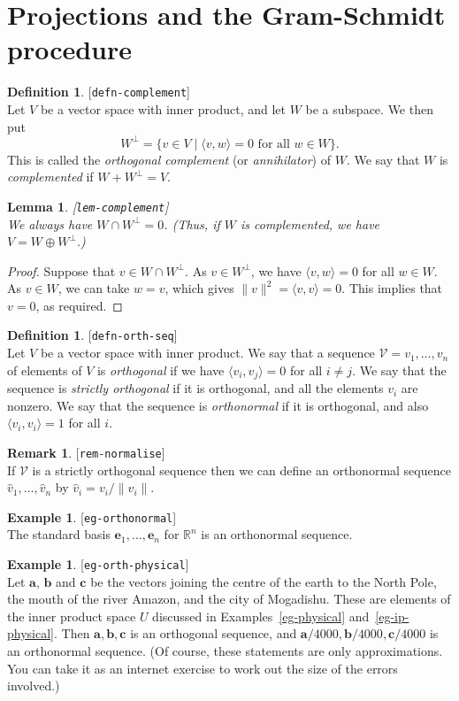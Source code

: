 \documentclass{amsart}
\newcommand{\lbl}[1]{\label{#1}\textup{[\texttt{#1}]}\ \\}
\newcommand{\lbl}{\label}
\newcommand{\R}         {{\mathbb{R}}}
\newcommand{\st}        {\;|\;}
\newcommand{\ip}[1]     {\langle #1\rangle}
\newcommand{\va}        {\mathbf{a}}
\newcommand{\vb}        {\mathbf{b}}
\newcommand{\vc}        {\mathbf{c}}
\newcommand{\ve}        {\mathbf{e}}
\newcommand{\CV}        {{\mathcal{V}}}
\renewcommand{\:}       {\colon}
\newtheorem{lemma}[theorem]{Lemma}
\theoremstyle{definition}
\newtheorem{remark}[theorem]{Remark}
\newtheorem{definition}[theorem]{Definition}
\newtheorem{example}[theorem]{Example}
\begin{document}
\section{Projections and the Gram-Schmidt procedure}
\label{sec-gram}

\begin{definition}\lbl{defn-complement}
 Let $V$ be a vector space with inner product, and let $W$
 be a subspace.  We then put 
 \[ W^\perp =
     \{v\in V\st \ip{v,w}=0 \text{ for all } w\in W\}.
 \]
 This is called the \emph{orthogonal complement} (or
 \emph{annihilator}) of $W$.  We say that $W$ is
 \emph{complemented} if $W+W^\perp=V$.
\end{definition}
\begin{lemma}\lbl{lem-complement}
 We always have $W\cap W^\perp=0$.  (Thus, if $W$ is
 complemented, we have $V=W\oplus W^\perp$.)
\end{lemma}
\begin{proof}
 Suppose that $v\in W\cap W^\perp$.  As $v\in W^\perp$, we
 have $\ip{v,w}=0$ for all $w\in W$.  As $v\in W$, we can
 take $w=v$, which gives $\|v\|^2=\ip{v,v}=0$.  This implies
 that $v=0$, as required.
\end{proof}

\begin{definition}\lbl{defn-orth-seq}
 Let $V$ be a vector space with inner product.  We say that
 a sequence $\CV=v_1,\dotsc,v_n$ of elements of $V$ is
 \emph{orthogonal} if we have $\ip{v_i,v_j}=0$ for all
 $i\neq j$.  We say that the sequence is \emph{strictly
  orthogonal} if it is orthogonal, and all the elements
 $v_i$ are nonzero.  We say that the sequence is
 \emph{orthonormal} if it is orthogonal, and also
 $\ip{v_i,v_i}=1$ for all $i$.
\end{definition}
\begin{remark}\lbl{rem-normalise}
 If $\CV$ is a strictly orthogonal sequence then we can
 define an orthonormal sequence $\hat{v}_1,\dotsc,\hat{v}_n$
 by $\hat{v}_i=v_i/\|v_i\|$.
\end{remark}

\begin{example}\lbl{eg-orthonormal}
 The standard basis $\ve_1,\dotsc,\ve_n$ for $\R^n$ is an
 orthonormal sequence.
\end{example}
\begin{example}\lbl{eg-orth-physical}
 Let $\va$, $\vb$ and $\vc$ be the vectors joining the
 centre of the earth to the North Pole, the mouth of the
 river Amazon, and the city of Mogadishu.  These are
 elements of the inner product space $U$ discussed in
 Examples~\ref{eg-physical} and~\ref{eg-ip-physical}.  Then
 $\va,\vb,\vc$ is an orthogonal sequence, and
 $\va/4000,\vb/4000,\vc/4000$ is an orthonormal sequence.
 (Of course, these statements are only approximations.  You
 can take it as an internet exercise to work out the size of the
 errors involved.)
\end{example}
\end{document}
